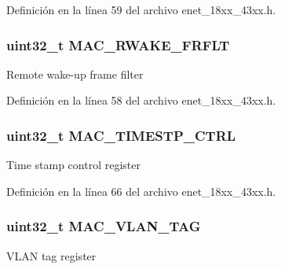 Definición en la línea 59 del archivo enet\+\_\+18xx\+\_\+43xx.\+h.

\subsubsection[{\texorpdfstring{M\+A\+C\+\_\+\+R\+W\+A\+K\+E\+\_\+\+F\+R\+F\+LT}{MAC_RWAKE_FRFLT}}]{ uint32\+\_\+t M\+A\+C\+\_\+\+R\+W\+A\+K\+E\+\_\+\+F\+R\+F\+LT}\hypertarget{struct_l_p_c___e_n_e_t___t_a074c138d1896840cf6c12a1492148915}{}\label{struct_l_p_c___e_n_e_t___t_a074c138d1896840cf6c12a1492148915}
Remote wake-\/up frame filter 

Definición en la línea 58 del archivo enet\+\_\+18xx\+\_\+43xx.\+h.

\subsubsection[{\texorpdfstring{M\+A\+C\+\_\+\+T\+I\+M\+E\+S\+T\+P\+\_\+\+C\+T\+RL}{MAC_TIMESTP_CTRL}}]{ uint32\+\_\+t M\+A\+C\+\_\+\+T\+I\+M\+E\+S\+T\+P\+\_\+\+C\+T\+RL}\hypertarget{struct_l_p_c___e_n_e_t___t_a6dbd0f1df5e15eddacea0d28f9f623c8}{}\label{struct_l_p_c___e_n_e_t___t_a6dbd0f1df5e15eddacea0d28f9f623c8}
Time stamp control register 

Definición en la línea 66 del archivo enet\+\_\+18xx\+\_\+43xx.\+h.

\subsubsection[{\texorpdfstring{M\+A\+C\+\_\+\+V\+L\+A\+N\+\_\+\+T\+AG}{MAC_VLAN_TAG}}]{ uint32\+\_\+t M\+A\+C\+\_\+\+V\+L\+A\+N\+\_\+\+T\+AG}\hypertarget{struct_l_p_c___e_n_e_t___t_a2ca360978300772083d55bd0e9d86cd3}{}\label{struct_l_p_c___e_n_e_t___t_a2ca360978300772083d55bd0e9d86cd3}
V\+L\+AN tag register 

